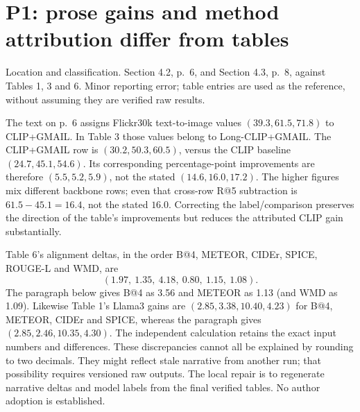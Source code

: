 \documentclass[10pt]{article}
\begin{document}
\section*{P1: prose gains and method attribution differ from tables}
Location and classification. Section 4.2, p. 6, and Section 4.3, p. 8, against Tables 1, 3 and 6. Minor reporting error; table entries are used as the reference, without assuming they are verified raw results.\par
The text on p. 6 assigns Flickr30k text-to-image values \((39.3,61.5,71.8)\) to CLIP+GMAIL. In Table 3 those values belong to Long-CLIP+GMAIL. The CLIP+GMAIL row is \((30.2,50.3,60.5)\), versus the CLIP baseline \((24.7,45.1,54.6)\). Its corresponding percentage-point improvements are therefore \((5.5,5.2,5.9)\), not the stated \((14.6,16.0,17.2)\). The higher figures mix different backbone rows; even that cross-row R@5 subtraction is \(61.5-45.1=16.4\), not the stated \(16.0\). Correcting the label/comparison preserves the direction of the table’s improvements but reduces the attributed CLIP gain substantially.\par
Table 6’s alignment deltas, in the order B@4, METEOR, CIDEr, SPICE, ROUGE-L and WMD, are \[(1.97,\ 1.35,\ 4.18,\ 0.80,\ 1.15,\ 1.08).\] The paragraph below gives B@4 as 3.56 and METEOR as 1.13 (and WMD as 1.09). Likewise Table 1’s Llama3 gains are \((2.85,3.38,10.40,4.23)\) for B@4, METEOR, CIDEr and SPICE, whereas the paragraph gives \((2.85,2.46,10.35,4.30)\). The independent calculation retains the exact input numbers and differences. These discrepancies cannot all be explained by rounding to two decimals. They might reflect stale narrative from another run; that possibility requires versioned raw outputs. The local repair is to regenerate narrative deltas and model labels from the final verified tables. No author adoption is established.\par
\end{document}
